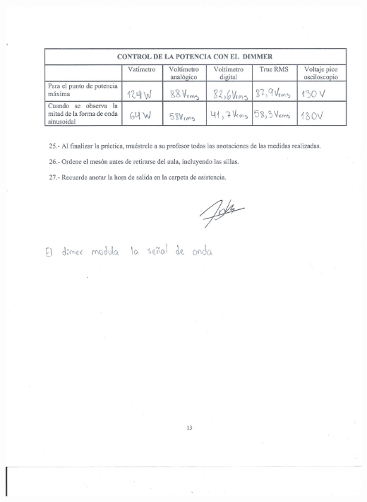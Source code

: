 \documentclass[12pt]{article}
\begin{document}
	\includegraphics[width=16cm,height=21cm]{Img/Resultados_10}\\
	
\end{document}
